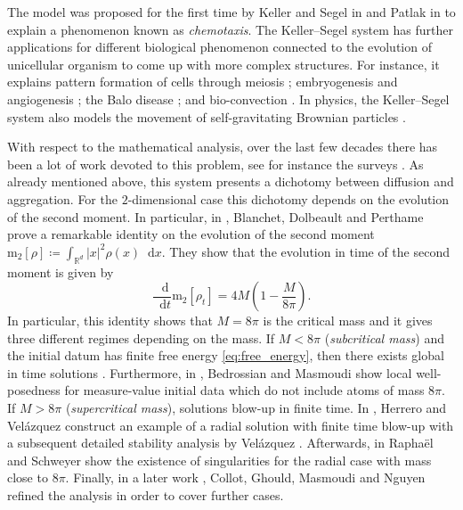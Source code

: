 \documentclass[11pt,a4paper]{article}
\numberwithin{equation}{section}
\newcommand{\R}{{\mathbb{R}}}
\theoremstyle{plain}
\theoremstyle{remark}
\newcommand{\diff}{\mathop{}\!\mathrm{d}}
\begin{document}
The model was proposed for the first time by Keller and Segel in \cite{Keller_Segel71} and Patlak in \cite{Patlak53} to explain a phenomenon known as \textit{chemotaxis}.
The Keller--Segel system has further applications for different biological phenomenon connected to the evolution of unicellular organism to come up with more complex structures. For instance, it explains pattern formation of cells through meiosis \cite{Calvez_Hawkins_Meunier_Voituriez12}; embryogenesis and angiogenesis \cite{Chaplain96, Levine_Sleeman_Nilsen-Hamilton01}; the Balo disease \cite{Khonsari_Calvez07}; and bio-convection \cite{Chertock_Fellner_Kurganov_Lorz_Markowich12}. In physics, the Keller--Segel system also models the movement of self-gravitating Brownian particles \cite{Chavanis03}.



With respect to the mathematical analysis, over the last few decades there has been a lot of work devoted to this problem, see for instance the surveys \cite{Horstmann03, Perthame04, Carrillo_Craig_Yao19}. As already mentioned above, this system presents a dichotomy between diffusion and aggregation. For the $2$-dimensional case this dichotomy depends on the evolution of the second moment. In particular, in \cite{Blanchet_Dolbeault_Perthame06}, Blanchet, Dolbeault and Perthame prove a remarkable identity on the evolution of the second moment $
\mathrm{m}_{2}[\rho]\coloneqq \int_{\R^d}|x|^2\rho(x)\diff x
$. They show that the evolution in time of the second moment is given by
\begin{equation*}
    \frac{\diff}{\diff t} \mathrm{m}_{2}[\rho_t] = 4M \left( 1 - \frac{M}{8 \pi} \right).
\end{equation*}
In particular, this identity shows that $M= 8 \pi$ is the critical mass and it gives three different regimes depending on the mass. If $M < 8 \pi$ (\textit{subcritical mass}) and the initial datum has finite free energy \eqref{eq:free_energy}, then there exists global in time solutions \cite{Jager_Luckhaus92, Nagai_Senba_Yoshida97, Biler_Karch_Laurencot_Nadzieja06, Blanchet_Dolbeault_Perthame06, Blanchet_Calvez_Carrillo08, Campos_Dolbeault14,2024arXiv241015095E}. Furthermore, in \cite{Bedrossian_Masmoudi14}, Bedrossian and Masmoudi show local well-posedness for measure-value initial data which do not include atoms of mass $8\pi$. If $M > 8 \pi$ (\textit{supercritical mass}), solutions blow-up in finite time. 
In \cite{Herrero_Velazquez96}, Herrero and Velázquez construct an example of a radial solution with finite time blow-up with a subsequent detailed stability analysis by Velázquez \cite{Velazquez02, Velazquez04a, Velazquez04b}. Afterwards, in \cite{Raphael_Schweyer14} Rapha\"el and Schweyer show the existence of singularities for the radial case with mass close to $8 \pi$. Finally, in a later work \cite{Collot_Ghoul_Masmoudi_Nguyen22, Collot_Ghoul_Masmoudi_Nguyen22b}, Collot, Ghould, Masmoudi and Nguyen refined the analysis in order to cover further cases.   %
\end{document}
